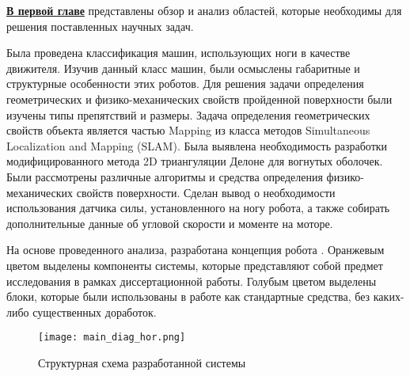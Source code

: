 \textbf{\underline{В первой главе}} представлены обзор и анализ областей, которые необходимы для решения поставленных научных задач.

Была проведена классификация машин, использующих ноги в качестве движителя. Изучив данный класс машин, были осмыслены габаритные и структурные особенности этих роботов. Для решения задачи определения геометрических и физико-механических свойств пройденной поверхности были изучены типы препятствий и размеры. Задача определения геометрических свойств объекта является частью Mapping из класса методов Simultaneous Localization and Mapping (SLAM). Была выявлена необходимость разработки модифицированного метода 2D триангуляции Делоне для вогнутых оболочек. Были рассмотрены различные алгоритмы и средства определения физико-механических свойств поверхности. Сделан вывод о необходимости использования датчика силы, установленного на ногу робота, а также собирать дополнительные данные об угловой скорости и моменте на моторе.

На основе проведенного анализа, разработана концепция робота . Оранжевым цветом выделены компоненты системы, которые представляют собой предмет исследования в рамках диссертационной работы. Голубым цветом выделены блоки, которые были использованы в работе как стандартные средства, без каких-либо существенных доработок.
\begin{figure}[h]
    \centering\texttt{[image: main\_diag\_hor.png]}
    \caption{Структурная схема разработанной системы}
    \label{fig:diag_system.png}
\end{figure}
